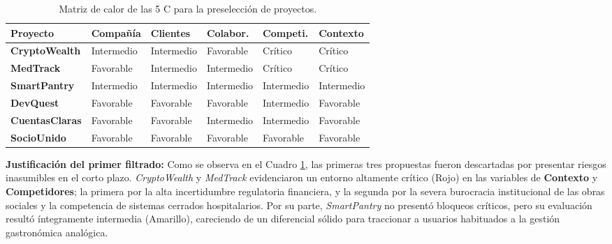 \begin{table}[h!]
\centering
\renewcommand{\arraystretch}{1.5}
\begin{tabularx}{\textwidth}{|l|X|X|X|X|X|}
\hline
\rowcolor{gray!20} \textbf{Proyecto} & \textbf{Compañía} & \textbf{Clientes} & \textbf{Colabor.} & \textbf{Competi.} & \textbf{Contexto} \\ \hline
\textbf{CryptoWealth} & \cellcolor{yellow!50}Intermedio & \cellcolor{yellow!50}Intermedio & \cellcolor{green!50}Favorable & \cellcolor{red!50}Crítico & \cellcolor{red!50}Crítico \\ \hline
\textbf{MedTrack} & \cellcolor{green!50}Favorable & \cellcolor{yellow!50}Intermedio & \cellcolor{yellow!50}Intermedio & \cellcolor{red!50}Crítico & \cellcolor{red!50}Crítico \\ \hline
\textbf{SmartPantry} & \cellcolor{yellow!50}Intermedio & \cellcolor{yellow!50}Intermedio & \cellcolor{yellow!50}Intermedio & \cellcolor{yellow!50}Intermedio & \cellcolor{yellow!50}Intermedio \\ \hline
\textbf{DevQuest} & \cellcolor{green!50}Favorable & \cellcolor{green!50}Favorable & \cellcolor{green!50}Favorable & \cellcolor{yellow!50}Intermedio & \cellcolor{green!50}Favorable \\ \hline
\textbf{CuentasClaras} & \cellcolor{green!50}Favorable & \cellcolor{green!50}Favorable & \cellcolor{yellow!50}Intermedio & \cellcolor{yellow!50}Intermedio & \cellcolor{green!50}Favorable \\ \hline
\textbf{SocioUnido} & \cellcolor{green!50}Favorable & \cellcolor{green!50}Favorable & \cellcolor{green!50}Favorable & \cellcolor{green!50}Favorable & \cellcolor{green!50}Favorable \\ \hline
\end{tabularx}
\caption{Matriz de calor de las 5 C para la preselección de proyectos.}
\label{tab:semaforo_5c}
\end{table}

\textbf{Justificación del primer filtrado:}
Como se observa en el Cuadro \ref{tab:semaforo_5c}, las primeras tres propuestas fueron descartadas por presentar riesgos inasumibles en el corto plazo. \textit{CryptoWealth} y \textit{MedTrack} evidenciaron un entorno altamente crítico (\colorbox{red!50}{Rojo}) en las variables de \textbf{Contexto} y \textbf{Competidores}; la primera por la alta incertidumbre regulatoria financiera, y la segunda por la severa burocracia institucional de las obras sociales y la competencia de sistemas cerrados hospitalarios. Por su parte, \textit{SmartPantry} no presentó bloqueos críticos, pero su evaluación resultó íntegramente intermedia (\colorbox{yellow!50}{Amarillo}), careciendo de un diferencial sólido para traccionar a usuarios habituados a la gestión gastronómica analógica.

